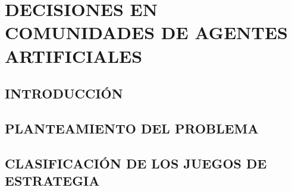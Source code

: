 

\chapter{DECISIONES EN COMUNIDADES DE AGENTES ARTIFICIALES}

\section{INTRODUCCIÓN}

\section{PLANTEAMIENTO DEL PROBLEMA}\label{Sec:Planteamiento}

\section{CLASIFICACIÓN DE LOS JUEGOS DE ESTRATEGIA}\label{Sec:Clas_JE}


